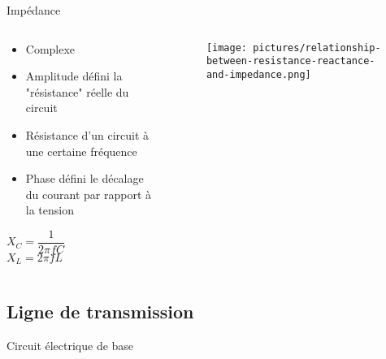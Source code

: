 \begin{frame}{Impédance}
    \begin{columns}
        \begin{column}{0.5\textwidth}
            \begin{itemize}
                \item Complexe
                \item Amplitude défini la "résistance" réelle du circuit
                \item Résistance d'un circuit à une certaine fréquence
                \item Phase défini le décalage du courant par rapport à la tension
            \end{itemize}
            \par
            \vspace{10pt}
            \begin{center}
                \Large{$X_C = \dfrac{1}{2 \pi f C}$}\\
                \vspace{10pt}
                \Large{$X_L = 2 \pi f L$}
            \end{center}
        \end{column}
        
        \begin{column}{0.5\textwidth}
            \begin{figure}
                \centering
                \texttt{[image: pictures/relationship-between-resistance-reactance-and-impedance.png]}
            \end{figure}
        \end{column}
    \end{columns}
\end{frame}

\subsection{Ligne de transmission}
\begin{frame}{Circuit électrique de base}
    \begin{center}
    
    \end{center}
\end{frame}

